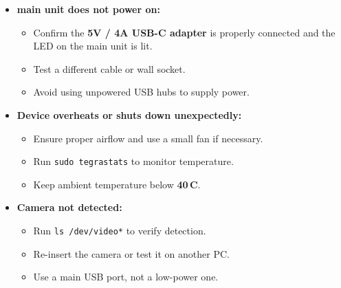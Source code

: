 \begin{itemize}
	\item \textbf{main unit  does not power on:}
	\begin{itemize}
		\item Confirm the \textbf{5V / 4A USB-C adapter} is properly connected and the LED on the main unit is lit.  
		\item Test a different cable or wall socket.  
		\item Avoid using unpowered USB hubs to supply power.
	\end{itemize}
	
	\item \textbf{Device overheats or shuts down unexpectedly:}
	\begin{itemize}
		\item Ensure proper airflow and use a small fan if necessary.  
		\item Run \texttt{sudo tegrastats} to monitor temperature.  
		\item Keep ambient temperature below \textbf{40\,\textdegree C}.
	\end{itemize}
	
	\item \textbf{Camera not detected:}
	\begin{itemize}
		\item Run \texttt{ls /dev/video*} to verify detection.  
		\item Re-insert the camera or test it on another PC.  
		\item Use a main USB port, not a low-power one.
	\end{itemize}
\end{itemize}

%		
%		


